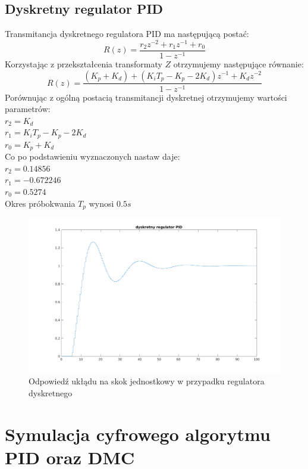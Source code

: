 \documentclass[a4paper, 11pt]{article}
\begin{document}
\subsection{Dyskretny regulator PID}
Transmitancja dyskretnego regulatora PID ma następującą postać: 
$$R(z) = \frac{r_2z^{-2} + r_1z^{-1} + r_0}{1-z^{-1}}$$
Korzystając z przekształcenia transformaty $Z$ otrzymujemy następujące równanie: 
$$R(z) = \frac{(K_p+K_d)+(K_iT_p-K_p-2K_d)z^{-1} + K_dz^{-2}}{1-z^{-1}}$$
Porównując z ogólną postacią transmitancji dyskretnej otrzymujemy wartości parametrów: \\

$r_2 = K_d$\\
\indent$r_1 = K_iT_p -K_p-2K_d$\\
\indent$r_0 = K_p + K_d$\\

\noindent Co po podstawieniu wyznaczonych nastaw daje: \\

$r_2 = 0.14856$\\ 
\indent $r_1 = -0.672246$\\
\indent $r_0 = 0.5274$\\

Okres próbokwania $T_p$ wynosi $0.5s$

\begin{figure}[htp]
\centering
\includegraphics[scale=0.60]{2_2.png}
\caption{Odpowiedź ukłądu na skok jednostkowy w przypadku regulatora dyskretnego}
\label{}
\end{figure}

\section{Symulacja cyfrowego algorytmu PID oraz DMC }
\end{document}
